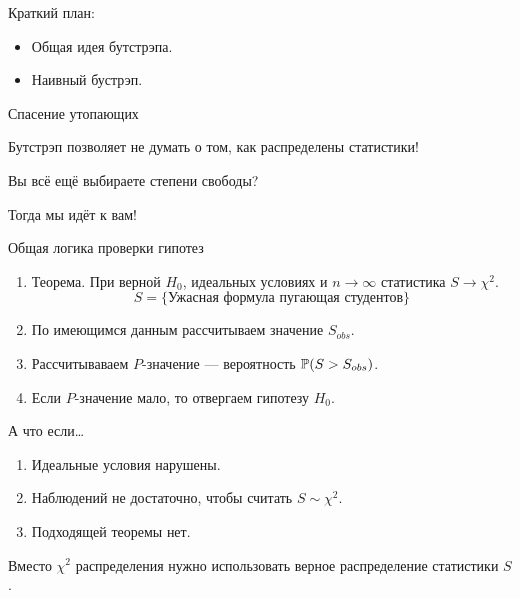 
\begin{frame} %


\end{frame}



\begin{frame}{Краткий план:}
  \begin{itemize}[<+->]
    \item Общая идея бутстрэпа.
    \item Наивный бустрэп.
  \end{itemize}

\end{frame}


\begin{frame}{Спасение утопающих}

  \alert{Бутстрэп} позволяет не думать о том, как распределены статистики!
  
  \pause

  Вы всё ещё выбираете степени свободы? 
  
  \pause
  
  Тогда мы идёт к вам! 
\end{frame}

\begin{frame}{Общая логика проверки гипотез}

\begin{enumerate}[<+->]
  \item Теорема. При верной $H_0$, \alert{идеальных условиях} и \alert{$n\to\infty$} статистика $S \to \chi^2$.
  \[
  S = \{ \text{Ужасная формула пугающая студентов}\}  
  \]
  \item По имеющимся данным рассчитываем значение $S_{obs}$.
  \item Рассчитываваем $P$-значение — вероятность $\P(S > S_{obs})$.
  \item Если $P$-значение мало, то отвергаем гипотезу $H_0$.
\end{enumerate}

\end{frame}

\begin{frame}{А что если\ldots}

  \begin{enumerate}[<+->]
    \item \alert{Идеальные условия} нарушены.
    \item Наблюдений \alert{не достаточно}, чтобы считать $S \sim \chi^2$.
    \item Подходящей \alert{теоремы нет}. 
  \end{enumerate}
  
  \pause
  Вместо $\chi^2$ распределения нужно использовать \alert{верное} распределение статистики $S$.

\end{frame}



